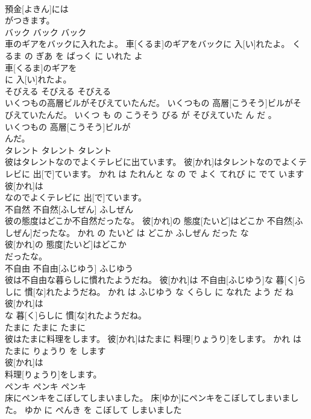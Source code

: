 \documentclass[8pt]{extreport}
\begin{document}
\begin{CJK}{UTF8}{min}
\\	預金[よきん]には
\\	がつきます。			
\\	バック	バック	バック	
\\	車のギアをバックに入れたよ。	車[くるま]のギアをバックに 入[い]れたよ。	くるま の ぎあ を ばっく に いれた よ	
\\	車[くるま]のギアを
\\	に 入[い]れたよ。			
\\	そびえる	そびえる	そびえる	
\\	いくつもの高層ビルがそびえていたんだ。	いくつもの 高層[こうそう]ビルがそびえていたんだ。	いくつ も の こうそう びる が そびえていた ん だ 。	
\\	いくつもの 高層[こうそう]ビルが
\\	んだ。			
\\	タレント	タレント	タレント	
\\	彼はタレントなのでよくテレビに出ています。	彼[かれ]はタレントなのでよくテレビに 出[で]ています。	かれ は たれんと な の で よく てれび に でて います	
\\	彼[かれ]は
\\	なのでよくテレビに 出[で]ています。			
\\	不自然	不自然[ふしぜん]	ふしぜん	
\\	彼の態度はどこか不自然だったな。	彼[かれ]の 態度[たいど]はどこか 不自然[ふしぜん]だったな。	かれ の たいど は どこか ふしぜん だった な	
\\	彼[かれ]の 態度[たいど]はどこか
\\	だったな。			
\\	不自由	不自由[ふじゆう]	ふじゆう	
\\	彼は不自由な暮らしに慣れたようだね。	彼[かれ]は 不自由[ふじゆう]な 暮[く]らしに 慣[な]れたようだね。	かれ は ふじゆう な くらし に なれた よう だ ね	
\\	彼[かれ]は
\\	な 暮[く]らしに 慣[な]れたようだね。			
\\	たまに	たまに	たまに	
\\	彼はたまに料理をします。	彼[かれ]はたまに 料理[りょうり]をします。	かれ は たまに りょうり を します	
\\	彼[かれ]は
\\	料理[りょうり]をします。			
\\	ペンキ	ペンキ	ペンキ	
\\	床にペンキをこぼしてしまいました。	床[ゆか]にペンキをこぼしてしまいました。	ゆか に ぺんき を こぼして しまいました	

\end{CJK}
\end{document}
